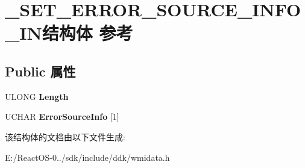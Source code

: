 \hypertarget{struct___s_e_t___e_r_r_o_r___s_o_u_r_c_e___i_n_f_o___i_n}{}\section{\+\_\+\+S\+E\+T\+\_\+\+E\+R\+R\+O\+R\+\_\+\+S\+O\+U\+R\+C\+E\+\_\+\+I\+N\+F\+O\+\_\+\+I\+N结构体 参考}
\label{struct___s_e_t___e_r_r_o_r___s_o_u_r_c_e___i_n_f_o___i_n}
\subsection*{Public 属性}
\begin{DoxyCompactItemize}
\item 
\mbox{\label{struct___s_e_t___e_r_r_o_r___s_o_u_r_c_e___i_n_f_o___i_n_a83d00161fb5cdb6a0e3a4e5e7827ef35}} 
U\+L\+O\+NG {\bfseries Length}
\item 
\mbox{\label{struct___s_e_t___e_r_r_o_r___s_o_u_r_c_e___i_n_f_o___i_n_afb90025e94b2c5ea5b7fc0597402cf1b}} 
U\+C\+H\+AR {\bfseries Error\+Source\+Info} \mbox{[}1\mbox{]}
\end{DoxyCompactItemize}


该结构体的文档由以下文件生成\+:\begin{DoxyCompactItemize}
\item 
E\+:/\+React\+O\+S-\/0../sdk/include/ddk/wmidata.\+h\end{DoxyCompactItemize}
